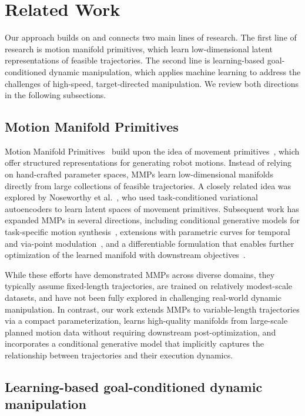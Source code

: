 \documentclass[letterpaper, 10 pt, conference]{ieeeconf}  %
\begin{document}
\section{Related Work}

Our approach builds on and connects two main lines of research. 
The first line of research is motion manifold primitives, which learn low-dimensional latent representations of feasible trajectories. 
The second line is learning-based goal-conditioned dynamic manipulation, which applies machine learning to address the challenges of high-speed, target-directed manipulation. 
We review both directions in the following subsections.

\subsection{Motion Manifold Primitives}

Motion Manifold Primitives~\cite{lee2023mmp} build upon the idea of movement primitives~\cite{ijspeert2013dmp, paraschos2013promp, zhou2019vmp}, 
which offer structured representations for generating robot motions. 
Instead of relying on hand-crafted parameter spaces, MMPs learn low-dimensional manifolds directly from large collections of feasible trajectories. 
A closely related idea was explored by Noseworthy et al.~\cite{noseworthy2022tcvae}, who used task-conditioned variational autoencoders to learn latent spaces of movement primitives. 
Subsequent work has expanded MMPs in several directions, including conditional generative models for task-specific motion synthesis~\cite{lee2024mmfp}, 
extensions with parametric curves for temporal and via-point modulation~\cite{lee2024mmp}, 
and a differentiable formulation that enables further optimization of the learned manifold with downstream objectives~\cite{lee2025diffmmp}.

While these efforts have demonstrated MMPs across diverse domains, they typically assume fixed-length trajectories, are trained on relatively modest-scale datasets, and have not been fully explored in challenging real-world dynamic manipulation. In contrast, our work extends MMPs to variable-length trajectories via a compact parameterization, learns high-quality manifolds from large-scale planned motion data without requiring downstream post-optimization, and incorporates a conditional generative model that implicitly captures the relationship between trajectories and their execution dynamics.

\subsection{Learning-based goal-conditioned dynamic manipulation}
\end{document}
